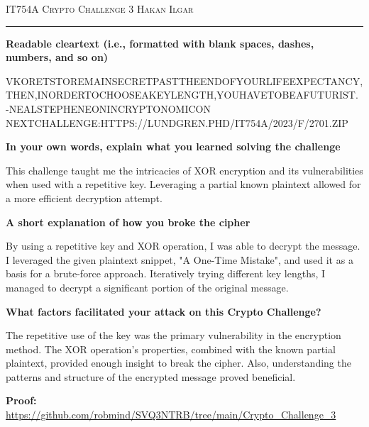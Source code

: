 \documentclass[12pt]{amsart}
\begin{document}
\thispagestyle{empty}

{\scshape IT754A} \hfill {\scshape \large Crypto Challenge 3} \hfill {\scshape Hakan Ilgar}

\smallskip
\hrule
\bigskip
\bigskip

{\bf Readable cleartext (i.e., formatted with blank spaces, dashes, numbers, and so on)}
\bigskip

VKORETSTOREMAINSECRETPASTTHEENDOFYOURLIFEEXPECTANCY, \\
THEN,INORDERTOCHOOSEAKEYLENGTH,YOUHAVETOBEAFUTURIST. \\
-NEALSTEPHENEONINCRYPTONOMICON \\
NEXTCHALLENGE:HTTPS://LUNDGREN.PHD/IT754A/2023/F/2701.ZIP

\bigskip

{\bf In your own words, explain what you learned solving the challenge}

\bigskip

This challenge taught me the intricacies of XOR encryption and its vulnerabilities when used with a repetitive key. Leveraging a partial known plaintext allowed for a more efficient decryption attempt.

\bigskip

{\bf A short explanation of how you broke the cipher}

\bigskip

By using a repetitive key and XOR operation, I was able to decrypt the message. I leveraged the given plaintext snippet, "A One-Time Mistake", and used it as a basis for a brute-force approach. Iteratively trying different key lengths, I managed to decrypt a significant portion of the original message.

\bigskip

{\bf What factors facilitated your attack on this Crypto Challenge?}

\bigskip

The repetitive use of the key was the primary vulnerability in the encryption method. The XOR operation's properties, combined with the known partial plaintext, provided enough insight to break the cipher. Also, understanding the patterns and structure of the encrypted message proved beneficial.

\bigskip

{\bf Proof:} \url{https://github.com/robmind/SVQ3NTRB/tree/main/Crypto_Challenge_3}
\bigskip
\end{document}
